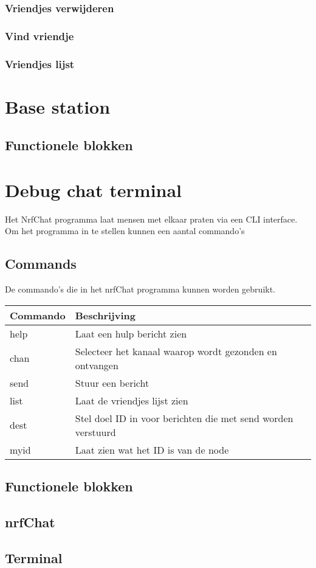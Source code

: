     \subsubsection{Vriendjes verwijderen}
    \subsubsection{Vind vriendje}
    \subsubsection{Vriendjes lijst} \label{ch:printFriends}

\section{Base station}
    \subsection{Functionele blokken}
\section{Debug chat terminal}

Het NrfChat programma laat mensen met elkaar praten via een CLI interface. Om het programma in te stellen kunnen een aantal commando's

\subsection{Commands}
De commando's die in het nrfChat programma kunnen worden gebruikt.

\begin{table}[h]
    \begin{tabular}{|l|l|} \hline
        \textbf{Commando} & \textbf{Beschrijving} \\\hline
        help & Laat een hulp bericht zien \\\hline
        chan & Selecteer het kanaal waarop wordt gezonden en ontvangen\\\hline
        send & Stuur een bericht \\\hline
        list & Laat de vriendjes lijst zien\\\hline
        dest & Stel doel ID in voor berichten die met send worden verstuurd \\\hline
        myid & Laat zien wat het ID is van de node \\\hline
    \end{tabular}
\end{table}

\subsection{Functionele blokken}

\subsection{nrfChat}
    

\subsection{Terminal}
    
    

    